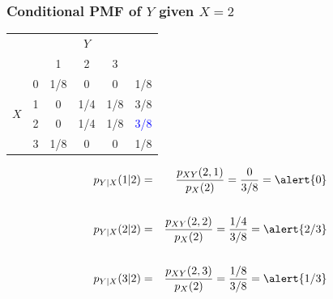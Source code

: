 \documentclass[handout]{beamer}
\begin{document}
\begin{frame}
\frametitle{Conditional PMF of $Y$ given $X = 2$}

\begin{table}
\begin{tabular}{|cc|ccc|c|}
\hline
&&\multicolumn{3}{c|}{$Y$}&\\
&&1 & 2&3&\\
\hline
\multirow{4}{*}{$X$}
&0& \multicolumn{1}{|c}{1/8} & 0& 0&1/8\\
&1& \multicolumn{1}{|c}{0} & 1/4&1/8&3/8\\
&2& \multicolumn{1}{|c}{\alert{0}} & \alert{1/4}&\alert{1/8}&\textcolor{blue}{3/8}\\
&3& \multicolumn{1}{|c}{1/8} & 0&0&1/8\\
\hline
\end{tabular}
\end{table}

\begin{eqnarray*}
	p_{Y|X}(1|2) &=& \frac{p_{XY}(2,1)}{p_X(2)} = \frac{0}{3/8} =\alert{0}\\ \\
	p_{Y|X}(2|2) &=&\frac{p_{XY}(2,2)}{p_X(2)}= \frac{1/4}{3/8} =\alert{2/3} \\ \\ 
	 p_{Y|X}(3|2) &=&\frac{p_{XY}(2,3)}{p_X(2)} = \frac{1/8}{3/8} = \alert{1/3}
\end{eqnarray*}


\end{frame}
\end{document}
